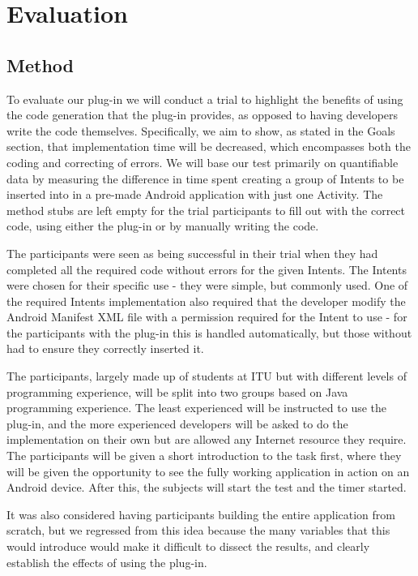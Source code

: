 \section{Evaluation}
\label{evaluation}

\subsection{Method}
\label{Method}
To evaluate our plug-in we will conduct a trial to highlight the benefits of using the code generation that the plug-in provides, as opposed to having developers write the code themselves. Specifically, we aim to show, as stated in the Goals section, that implementation time will be decreased, which encompasses both the coding and correcting of errors. We will base our test primarily on quantifiable data by measuring the difference in time spent creating a group of Intents to be inserted into in a pre-made Android application with just one Activity. The method stubs are left empty for the trial participants to fill out with the correct code, using either the plug-in or by manually writing the code.

The participants were seen as being successful in their trial when they had completed all the required code without errors for the given Intents. The Intents were chosen for their specific use - they were simple, but commonly used. One of the required Intents implementation also required that the developer modify the Android Manifest XML file with a permission required for the Intent to use - for the participants with the plug-in this is handled automatically, but those without had to ensure they correctly inserted it.

The participants, largely made up of students at ITU but with different levels of programming experience, will be split into two groups based on Java programming experience. The least experienced will be instructed to use the plug-in, and the more experienced developers will be asked to do the implementation on their own but are allowed any Internet resource they require. The participants will be given a short introduction to the task first, where they will be given the opportunity to see the fully working application in action on an Android device. After this, the subjects will start the test and the timer started.

It was also considered having participants building the entire application from scratch, but we regressed from this idea because the many variables that this would introduce would make it difficult to dissect the results, and clearly establish the effects of using the plug-in.

